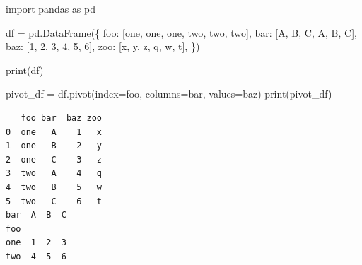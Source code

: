 \documentclass[
  english,
  letterpaper,
  DIV=11,
  numbers=noendperiod]{scrreprt}
\newenvironment{Shaded}{\begin{snugshade}}{\end{snugshade}}
\newcommand{\BuiltInTok}[1]{\textcolor[rgb]{0.00,0.23,0.31}{#1}}
\newcommand{\DecValTok}[1]{\textcolor[rgb]{0.68,0.00,0.00}{#1}}
\newcommand{\ImportTok}[1]{\textcolor[rgb]{0.00,0.46,0.62}{#1}}
\newcommand{\NormalTok}[1]{\textcolor[rgb]{0.00,0.23,0.31}{#1}}
\newcommand{\OperatorTok}[1]{\textcolor[rgb]{0.37,0.37,0.37}{#1}}
\newcommand{\StringTok}[1]{\textcolor[rgb]{0.13,0.47,0.30}{#1}}
\begin{document}
\begin{Shaded}
\begin{Highlighting}[]
\ImportTok{import}\NormalTok{ pandas }\ImportTok{as}\NormalTok{ pd}

\NormalTok{df }\OperatorTok{=}\NormalTok{ pd.DataFrame(\{}
    \StringTok{\textquotesingle{}foo\textquotesingle{}}\NormalTok{: [}\StringTok{\textquotesingle{}one\textquotesingle{}}\NormalTok{, }\StringTok{\textquotesingle{}one\textquotesingle{}}\NormalTok{, }\StringTok{\textquotesingle{}one\textquotesingle{}}\NormalTok{, }\StringTok{\textquotesingle{}two\textquotesingle{}}\NormalTok{, }\StringTok{\textquotesingle{}two\textquotesingle{}}\NormalTok{, }\StringTok{\textquotesingle{}two\textquotesingle{}}\NormalTok{],}
    \StringTok{\textquotesingle{}bar\textquotesingle{}}\NormalTok{: [}\StringTok{\textquotesingle{}A\textquotesingle{}}\NormalTok{, }\StringTok{\textquotesingle{}B\textquotesingle{}}\NormalTok{, }\StringTok{\textquotesingle{}C\textquotesingle{}}\NormalTok{, }\StringTok{\textquotesingle{}A\textquotesingle{}}\NormalTok{, }\StringTok{\textquotesingle{}B\textquotesingle{}}\NormalTok{, }\StringTok{\textquotesingle{}C\textquotesingle{}}\NormalTok{],}
    \StringTok{\textquotesingle{}baz\textquotesingle{}}\NormalTok{: [}\DecValTok{1}\NormalTok{, }\DecValTok{2}\NormalTok{, }\DecValTok{3}\NormalTok{, }\DecValTok{4}\NormalTok{, }\DecValTok{5}\NormalTok{, }\DecValTok{6}\NormalTok{],}
    \StringTok{\textquotesingle{}zoo\textquotesingle{}}\NormalTok{: [}\StringTok{\textquotesingle{}x\textquotesingle{}}\NormalTok{, }\StringTok{\textquotesingle{}y\textquotesingle{}}\NormalTok{, }\StringTok{\textquotesingle{}z\textquotesingle{}}\NormalTok{, }\StringTok{\textquotesingle{}q\textquotesingle{}}\NormalTok{, }\StringTok{\textquotesingle{}w\textquotesingle{}}\NormalTok{, }\StringTok{\textquotesingle{}t\textquotesingle{}}\NormalTok{],}
\NormalTok{\})}

\BuiltInTok{print}\NormalTok{(df)}

\NormalTok{pivot\_df }\OperatorTok{=}\NormalTok{ df.pivot(index}\OperatorTok{=}\StringTok{\textquotesingle{}foo\textquotesingle{}}\NormalTok{, columns}\OperatorTok{=}\StringTok{\textquotesingle{}bar\textquotesingle{}}\NormalTok{, values}\OperatorTok{=}\StringTok{\textquotesingle{}baz\textquotesingle{}}\NormalTok{)}
\BuiltInTok{print}\NormalTok{(pivot\_df)}
\end{Highlighting}
\end{Shaded}

\begin{verbatim}
   foo bar  baz zoo
0  one   A    1   x
1  one   B    2   y
2  one   C    3   z
3  two   A    4   q
4  two   B    5   w
5  two   C    6   t
bar  A  B  C
foo         
one  1  2  3
two  4  5  6
\end{verbatim}
\end{document}
